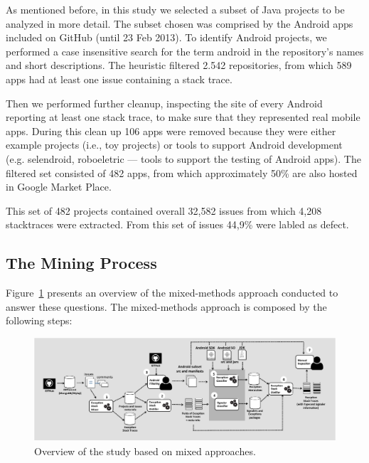 \documentclass[conference]{IEEEtran}
\begin{document}
As mentioned before, in this study we selected a subset of Java projects to
be analyzed in more detail. The subset chosen was comprised by the Android apps
included on GitHub (until 23 Feb 2013).
To identify Android projects, we performed a case insensitive search for the
term \textsf{android} in the repository's names and short descriptions.  The
heuristic filtered 2.542 repositories, from which 589 apps had at least one
issue containing a stack trace.

Then we performed further cleanup, inspecting the site of every Android
reporting at least one stack trace, to make sure that they represented real
mobile apps. During this clean up 106 apps were removed because they were either
example projects (i.e., toy projects) or tools to support Android development
(e.g. \textsf{selendroid}, \textsf{roboeletric} --- tools to support the testing of Android apps).
The filtered set consisted of 482 apps, from which approximately 50\% are also
hosted in Google Market Place. 

This set of 482 projects contained overall 32,582 issues from which 4,208 stacktraces 
were extracted. From this set of issues 44,9\% were labled as defect.

\subsection{The Mining Process}
\label{sec:miningproc}

Figure~\ref{fig:overviewfig} presents an overview of the mixed-methods approach
conducted to answer these questions. The mixed-methods approach is composed by the following steps:

\begin{figure}
\centering
\includegraphics[width=\hsize]{overview.pdf}
\caption{Overview of the study based on mixed approaches.}
\label{fig:overviewfig}
\end{figure}

\end{document}

